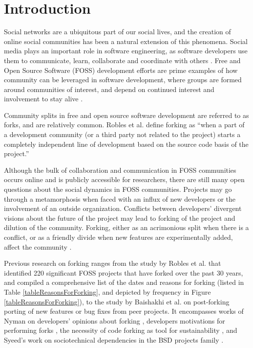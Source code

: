 \documentclass[12pt]{report}
\begin{document}
\pagebreak

\section{Introduction}
\label{introduction}
Social networks are a ubiquitous part of our social lives, and the creation of online social communities has been a natural extension of this phenomena. Social media plays an important role in software engineering, as software developers use them to communicate, learn, collaborate and coordinate with others \cite{Storey}. Free and Open Source Software (FOSS) development efforts are prime examples of how community can be leveraged in software development, where groups are formed around communities of interest, and depend on continued interest and involvement to stay alive \cite{NymanCodeForking}.

Community splits in free and open source software development are referred to as forks, and are relatively common. Robles et al. \cite{Robles} define forking as ``when a part of a development community (or a third party not related to the project) starts a completely independent line of development based on the source code basis of the project.'' 

Although the bulk of collaboration and communication in FOSS communities occurs online and is publicly accessible for researchers, there are still many open questions about the social dynamics in FOSS communities. Projects may go through a metamorphosis when faced with an influx of new developers or the involvement of an outside organization. Conflicts between developers' divergent visions about the future of the project may lead to forking of the project and dilution of the community. Forking, either as an acrimonious split when there is a conflict, or as a friendly divide when new features are experimentally added, affect the community \cite{Bezrukova}.

Previous research on forking ranges from the study by Robles et al. \cite{Robles} that identified 220 significant FOSS projects that have forked over the past 30 years, and compiled a comprehensive list of the dates and reasons for forking (listed in Table \ref{tableReasonsForForking}, and depicted by frequency in Figure \ref{tableReasonsForForking}), to the study by Baishakhi et al. \cite{Baishakhi} on post-forking porting of new features or bug fixes from peer projects. It encompasses works of Nyman on developers' opinions about forking \cite{NymanHackersForking}, developers motivations for performing forks \cite{NymanToForkOrNotToFork}, the necessity of code forking as tool for sustainability \cite{NymanForkingSustainability}, and Syeed's work on sociotechnical dependencies in the BSD projects family \cite{Syeed}.
\end{document}
